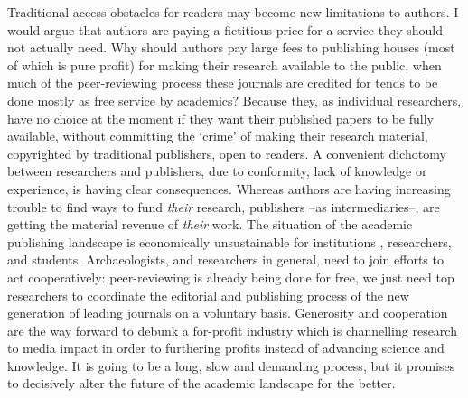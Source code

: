 Traditional access obstacles for readers may become new limitations to authors. I would argue that authors are paying a fictitious price for a service they should not actually need. Why should authors pay large fees to publishing houses (most of which is pure profit) for making their research available to the public, when much of the peer-reviewing process these journals are credited for tends to be done mostly as free service by academics? Because they, as individual researchers, have no choice at the moment if they want their published papers to be fully available, without committing the ‘crime’ of making their research material, copyrighted by traditional publishers, open to readers. A convenient dichotomy between researchers and publishers, due to conformity, lack of knowledge or experience, is having clear consequences. Whereas authors are having increasing trouble to find ways to fund \emph{their} research, publishers –as intermediaries–, are getting the material revenue of \emph{their} work. The situation of the academic publishing landscape is economically unsustainable for institutions \parencite{Sample_2012}, researchers, and students.  Archaeologists, and researchers in general, need to join efforts to act cooperatively: peer-reviewing is already being done for free, we just need top researchers to coordinate the editorial and publishing process of the new generation of leading journals on a voluntary basis. Generosity and cooperation are the way forward to debunk a for-profit industry which is channelling research to media impact in order to furthering profits instead of advancing science and knowledge. It is going to be a long, slow and demanding process, but it promises to decisively alter the future of the academic landscape for the better.

